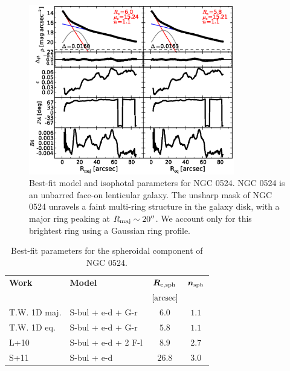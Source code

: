 \documentclass[preprint2]{emulateapj}
\newcommand{\fitfigurewidth}{0.8\textwidth}
\begin{document}
  \begin{figure}[h]
  \begin{center}
  \includegraphics[width=\fitfigurewidth]{images/n0524_1Dfit.eps}
  \caption{Best-fit model and isophotal parameters for NGC 0524.
  NGC 0524 is an unbarred face-on lenticular galaxy. 
  The unsharp mask of NGC 0524 unravels a faint multi-ring structure in the galaxy disk,
  with a major ring peaking at $R_{\rm maj} \sim 20''$.
  We account only for this brightest ring using a Gaussian ring profile.
  }
  \end{center}
  \end{figure}

  \begin{table}[h]
  \small
  \caption{Best-fit parameters for the spheroidal component of NGC 0524.}
  \begin{center}
  \begin{tabular}{llcc}
  \hline
  {\bf Work} & {\bf Model}   & $\bm R_{\rm e,sph}$    & $\bm n_{\rm sph}$ \\
    &  &  $[\rm arcsec]$ & \\
  \hline
  T.W. 1D maj. & S-bul + e-d + G-r & $6.0$  &  $1.1$ \\
  T.W. 1D eq.  & S-bul + e-d + G-r & $5.8$  &  $1.1$ \\
  \hline
  L+10      & S-bul + e-d + 2 F-l & $8.9$   &  $2.7$ \\
  S+11      & S-bul + e-d	  & $26.8$  &  $3.0$ \\
  \hline
  \end{tabular}
  \end{center}
  \label{tab:n0524}
  \end{table}
\end{document}
